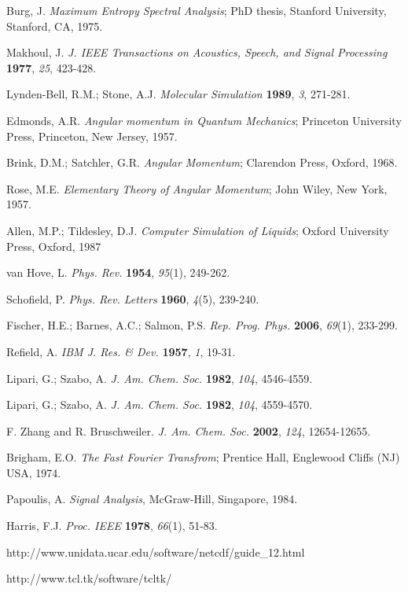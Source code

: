 \documentclass[a4paper,11pt]{article}
\begin{document}
\begin{thebibliography}{99}
 Burg, J. \textit{Maximum Entropy Spectral Analysis}; PhD thesis, Stanford University, Stanford, CA, 1975.

 Makhoul, J. \textit{J. IEEE Transactions on Acoustics, Speech, and Signal Processing} \textbf{1977}, \textit{25}, 423-428.

 Lynden-Bell, R.M.; Stone, A.J. \textit{Molecular Simulation} \textbf{1989}, \textit{3}, 271-281.

 Edmonds, A.R. \textit{Angular momentum in Quantum Mechanics}; Princeton University Press, Princeton, 
New Jersey, 1957.

 Brink, D.M.; Satchler, G.R. \textit{Angular Momentum}; Clarendon Press, Oxford, 1968.

 Rose, M.E. \textit{Elementary Theory of Angular Momentum}; John Wiley, New York, 1957.

 Allen, M.P.; Tildesley, D.J. \textit{Computer Simulation of Liquids}; Oxford University Press, Oxford, 1987

 van Hove, L. \textit{Phys.  Rev.} \textbf{1954}, \textit{95}(1), 249-262.

 Schofield, P. \textit{Phys. Rev. Letters} \textbf{1960}, \textit{4}(5), 239-240.

 Fischer, H.E.; Barnes, A.C.; Salmon, P.S. \textit{Rep. Prog. Phys.} \textbf{2006}, \textit{69}(1), 233-299.

 Refield, A. \textit{IBM J. Res. \& Dev.} \textbf{1957}, \textit{1}, 19-31.

 Lipari, G.; Szabo, A. \textit{J. Am. Chem. Soc.} \textbf{1982}, \textit{104}, 4546-4559. 

 Lipari, G.; Szabo, A. \textit{J. Am. Chem. Soc.} \textbf{1982}, \textit{104}, 4559-4570.

 F. Zhang and R. Bruschweiler. \textit{J. Am. Chem. Soc.} \textbf{2002}, \textit{124}, 12654-12655.

 Brigham, E.O. \textit{The Fast Fourier Transfrom}; Prentice Hall, Englewood Cliffs (NJ) USA, 1974.

 Papoulis, A. \textit{Signal Analysis}, McGraw-Hill, Singapore, 1984.

 Harris, F.J. \textit{Proc. IEEE} \textbf{1978}, \textit{66}(1), 51-83.

 http://www.unidata.ucar.edu/software/netcdf/guide\_12.html

 http://www.tcl.tk/software/tcltk/

\end{thebibliography}
\end{document}
